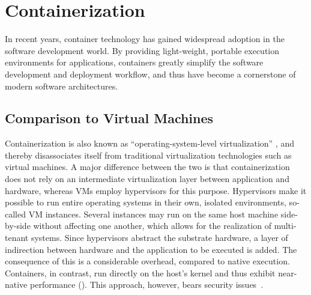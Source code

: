 \pagebreak
\section{Containerization}
In recent years, container technology has gained widespread adoption in the software development world. By providing light-weight, portable execution environments for applications, containers greatly simplify the software development and deployment workflow, and thus have become a cornerstone of modern software architectures.

\subsection{Comparison to Virtual Machines}
Containerization is also known as ``operating-system-level virtualization'' \cite{soltesz2007container}, and thereby disassociates itself from traditional virtualization technologies such as virtual machines. A major difference between the two is that containerization does not rely on an intermediate virtualization layer between application and hardware, whereas VMs employ hypervisors for this purpose. Hypervisors make it possible to run entire operating systems in their own, isolated environments, so-called VM instances. Several instances may run on the same host machine side-by-side without affecting one another, which allows for the realization of multi-tenant systems. Since hypervisors abstract the substrate hardware, a layer of indirection between hardware and the application to be executed is added. The consequence of this is a considerable overhead, compared to native execution. Containers, in contrast, run directly on the host's kernel and thus exhibit near-native performance (\cite{adufu2015container, felter2015updated, morabito2015hypervisors}). This approach, however, bears security issues~\cite{xavier2013performance}.


